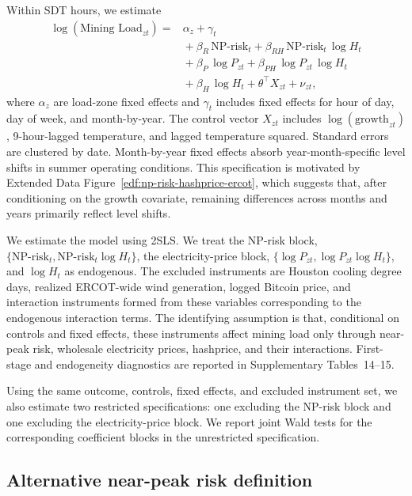 \documentclass[pdflatex,sn-mathphys-num]{sn-jnl}%
\theoremstyle{thmstyleone}%
\theoremstyle{thmstyletwo}%
\theoremstyle{thmstylethree}%
\begin{document}
Within SDT hours, we estimate
\begin{equation}
\label{eq:iv_main}
\begin{aligned}
\log(\text{Mining Load}_{zt})
= {} & \alpha_z + \gamma_t \\
& {} + \beta_R\,\text{NP-risk}_{t}
      + \beta_{RH}\,\text{NP-risk}_{t}\,\log H_t \\
& {} + \beta_P\,\log P_{zt}
      + \beta_{PH}\,\log P_{zt}\,\log H_t \\
& {} + \beta_H\,\log H_t
      + \theta^\top X_{zt}
      + \nu_{zt},
\end{aligned}
\end{equation}
where $\alpha_z$ are load-zone fixed effects and $\gamma_t$ includes fixed effects for hour of day, day of week, and month-by-year. The control vector $X_{zt}$ includes $\log(\text{growth}_{zt})$, 9-hour-lagged temperature, and lagged temperature squared. Standard errors are clustered by date. Month-by-year fixed effects absorb year-month-specific level shifts in summer operating conditions. This specification is motivated by Extended Data Figure~\ref{edf:np-risk-hashprice-ercot}, which suggests that, after conditioning on the growth covariate, remaining differences across months and years primarily reflect level shifts.

We estimate the model using 2SLS. We treat the NP-risk block, $\{\text{NP-risk}_{t},\text{NP-risk}_{t}\log H_t\}$, the electricity-price block, $\{\log P_{zt},\log P_{zt}\log H_t\}$, and $\log H_t$ as endogenous. The excluded instruments are Houston cooling degree days, realized ERCOT-wide wind generation, logged Bitcoin price, and interaction instruments formed from these variables corresponding to the endogenous interaction terms. The identifying assumption is that, conditional on controls and fixed effects, these instruments affect mining load only through near-peak risk, wholesale electricity prices, hashprice, and their interactions. First-stage and endogeneity diagnostics are reported in Supplementary Tables~14--15.

Using the same outcome, controls, fixed effects, and excluded instrument set, we also estimate two restricted specifications: one excluding the NP-risk block and one excluding the electricity-price block. We report joint Wald tests for the corresponding coefficient blocks in the unrestricted specification.

\subsection*{Alternative near-peak risk definition}
\end{document}
